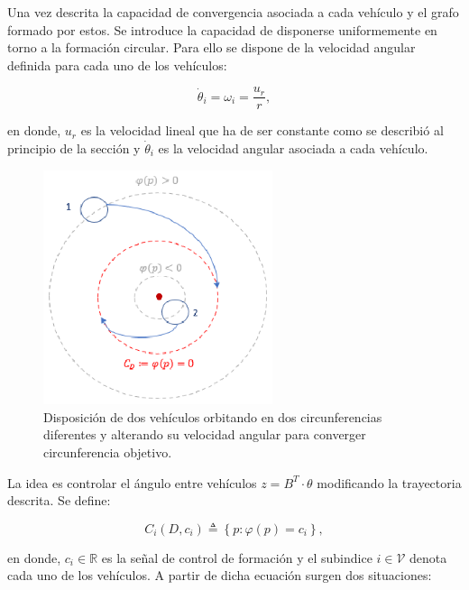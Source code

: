 Una vez descrita la capacidad de convergencia asociada a cada vehículo y el grafo formado por estos. Se introduce la capacidad de disponerse uniformemente en torno a la formación circular. Para ello se dispone de la velocidad angular definida para cada uno de los vehículos:

\begin{equation}
	\dot{\theta}_{i}=\omega_{i}=\frac{u_{r}}{r},
\end{equation}

en donde, $u_{r}$ es la velocidad lineal que ha de ser constante como se describió al principio de la sección y $\dot{\theta}_{i}$ es la velocidad angular asociada a cada vehículo.
\newpage

\begin{figure}[H]
\centering
\includegraphics[width=0.60\textwidth]{figures/Pruea_Coordinacion.eps}
\caption{Disposición de dos vehículos orbitando en dos circunferencias diferentes y alterando su velocidad angular para converger circunferencia objetivo.} \label{Ejemplo_Coordinacion}
\end{figure}

La idea es controlar el ángulo entre vehículos $z = B^{T}\cdot\theta$ modificando la trayectoria descrita. Se define:

\begin{equation}\label{Control}
	C_i\left(D,c_{i}\right)\triangleq\left\lbrace{p:\varphi\left(p\right)=c_{i}}\right\rbrace,
\end{equation}

en donde, $c_i \in \mathbb{R}$ es la señal de control de formación y el subindice $i\in\mathcal{V}$ denota cada uno de los vehículos. A partir de dicha ecuación surgen dos situaciones:

